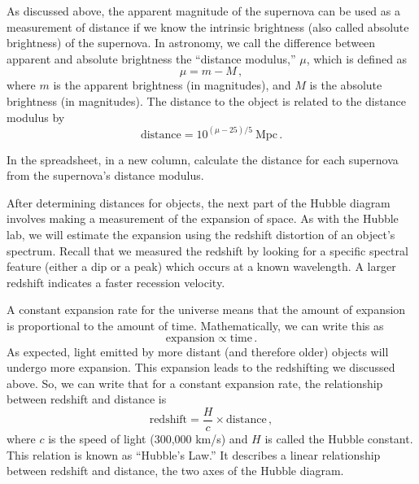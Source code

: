 As discussed above, the apparent magnitude of the supernova can be
used as a measurement of distance if we know the intrinsic brightness
(also called absolute brightness) of the supernova. In astronomy, we call
the difference between apparent and absolute brightness the “distance
modulus,” $\mu$, which is defined as
\begin{equation}
\mu = m - M \,,
\end{equation}
where $m$ is the apparent brightness (in
magnitudes), and $M$ is the absolute brightness (in magnitudes). The
distance to the object is related to the distance modulus by
\begin{equation}
 \textrm{distance} = 10^{(\mu-25)/5}\:\textrm{Mpc} \,.
\end{equation}

\begin{steps}
	\item In the spreadsheet, in a new column, calculate the distance for each supernova from the supernova’s
	distance modulus.
\end{steps}

After determining distances for objects, the next part of the Hubble
diagram involves making a measurement of the expansion of space. As
with the Hubble lab, we will estimate the expansion using the redshift
distortion of an object's spectrum. Recall that we measured the redshift
by looking for a specific spectral feature (either a dip or a peak) which
occurs at a known wavelength. A larger redshift indicates a faster recession velocity.

A constant expansion rate for the universe means that the amount of
expansion is proportional to the amount of time. Mathematically, we can
write this as
\begin{equation}
 \textrm{expansion} \propto \textrm{time} \,.
\end{equation}
As expected, light emitted by more distant (and therefore older) objects
will undergo more expansion. This expansion leads to the redshifting
we discussed above. So, we can write that for a constant expansion rate,
the relationship between redshift and distance is
\begin{equation}\label{de:eq:hubble}
 \textrm{redshift} = \frac{H}{c} \times \textrm{distance} \,,
\end{equation}
where $c$ is the speed of light (300,000 km/s) and $H$ is called the Hubble
constant. This relation is known as “Hubble’s Law.” It describes a linear
relationship between redshift and distance, the two axes of the Hubble
diagram.

